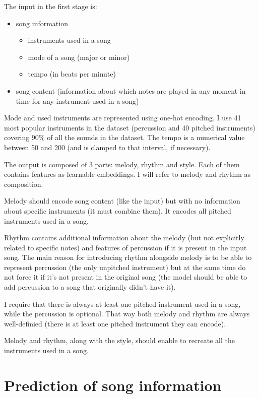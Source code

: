 \documentclass[en]{pracamgr}
\begin{document}
The input in the first stage is:
\begin{itemize}
    \item song information
    \begin{itemize}
        \item instruments used in a song
        \item mode of a song (major or minor)
        \item tempo (in beats per minute)
    \end{itemize}
    \item song content (information about which notes are played in any moment in time for any instrument used in a song)
\end{itemize}

Mode and used instruments are represented using one-hot encoding.
I use 41 most popular instruments in the dataset (percussion and 40 pitched instruments) covering 90\% of all the sounds in the dataset.
The tempo is a numerical value between 50 and 200 (and is clamped to that interval, if necessary).

The output is composed of 3 parts: melody, rhythm and style.
Each of them contains features as learnable embeddings.
I will refer to melody and rhythm as composition.

Melody should encode song content (like the input) but with no information about specific instruments (it must combine them).
It encodes all pitched instruments used in a song.

Rhythm contains additional information about the melody (but not explicitly related to specific notes) and features of percussion if it is present in the input song.
The main reason for introducing rhythm alongside melody is to be able to represent percussion (the only unpitched instrument) but at the same time do not force it if it's not present in the original song (the model should be able to add percussion to a song that originally didn't have it).

I require that there is always at least one pitched instrument used in a song, while the percussion is optional.
That way both melody and rhythm are always well-definied (there is at least one pitched instrument they can encode).

Melody and rhythm, along with the style, should enable to recreate all the instruments used in a song.

\section{Prediction of song information}
\end{document}
